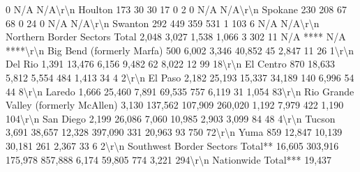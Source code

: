 \documentclass[
  12pt,
]{book}
\newenvironment{Shaded}{\begin{snugshade}}{\end{snugshade}}
\begin{document}
\begin{Shaded}
\begin{Highlighting}[]
0           N/A     N/A\textbackslash{}r\textbackslash{}n Houlton                                           173                 30                       30                      17                0                2               0           N/A     N/A\textbackslash{}r\textbackslash{}n Spokane                                           230                208                       67                      68                0               24               0           N/A     N/A\textbackslash{}r\textbackslash{}n Swanton                                           292                449                      359                     531                1              103               6           N/A     N/A\textbackslash{}r\textbackslash{}n Northern Border Sectors Total                    2,048              3,027                    1,538                   1,066               3              302              11        N/A **** N/A ****\textbackslash{}r\textbackslash{}n Big Bend (formerly Marfa)                         500               6,002                   3,346                   40,852              45             2,847             11            26      1\textbackslash{}r\textbackslash{}n Del Rio                                          1,391             13,476                    6,156                   9,482              62             8,022             12            99     18\textbackslash{}r\textbackslash{}n El Centro                                         870              18,633                    5,812                   5,554             484             1,413             34             4      2\textbackslash{}r\textbackslash{}n El Paso                                          2,182             25,193                   15,337                  34,189             140             6,996             54            44      8\textbackslash{}r\textbackslash{}n Laredo                                           1,666             25,460                    7,891                  69,535             757             6,119             31          1,054    83\textbackslash{}r\textbackslash{}n Rio Grande Valley (formerly McAllen)             3,130            137,562                  107,909                260,020             1,192            7,979            422          1,190   104\textbackslash{}r\textbackslash{}n San Diego                                        2,199             26,086                    7,060                  10,985            2,903            3,099             84            48      4\textbackslash{}r\textbackslash{}n Tucson                                           3,691             38,657                   12,328                397,090              331            20,963             93           750     72\textbackslash{}r\textbackslash{}n Yuma                                              859              12,847                   10,139                  30,181             261             2,367             33             6      2\textbackslash{}r\textbackslash{}n Southwest Border Sectors Total**                16,605            303,916                  175,978                857,888             6,174           59,805            774          3,221   294\textbackslash{}r\textbackslash{}n Nationwide Total***                             19,437 
\end{Highlighting}
\end{Shaded}
\end{document}
